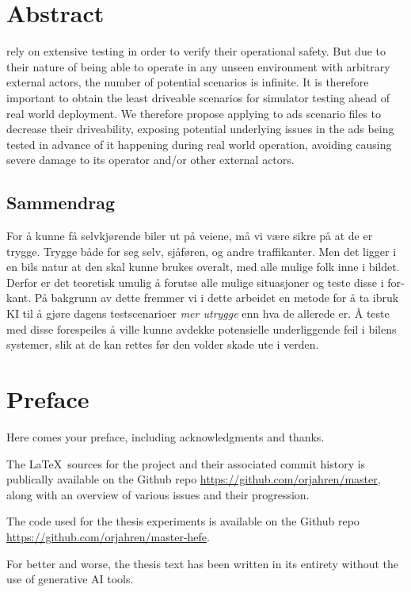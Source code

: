 \chapter*{Abstract}

 rely on extensive testing in order to verify their operational safety. But due to
their nature of being able to operate in any unseen environment with arbitrary external actors,
the number of potential scenarios is infinite. It is therefore important to obtain the least
driveable scenarios for simulator testing ahead of real world deployment. We therefore propose
applying  to \acrlong{ads} scenario files to decrease their driveability, exposing
potential underlying issues in the \acrshort{ads} being tested in advance of it happening during
real world operation, avoiding causing severe damage to its operator and/or other external actors.


\begin{otherlanguage}{norsk}
    \section*{Sammendrag}
    For å kunne få selvkjørende biler ut på veiene, må vi være sikre på at de er trygge. Trygge både
    for seg selv, sjåføren, og andre traffikanter. Men det ligger i en bils natur at den skal kunne
    brukes overalt, med alle mulige folk inne i bildet. Derfor er det teoretisk umulig å forutse
    alle mulige situasjoner og teste disse i forkant. På bakgrunn av dette fremmer vi i dette
    arbeidet en metode for å ta ibruk KI til å gjøre dagens testscenarioer \textit{mer utrygge} enn
    hva de allerede er. Å teste med disse forespeiles å ville kunne avdekke potensielle
    underliggende feil i bilens systemer, slik at de kan rettes før den volder skade ute i verden.
\end{otherlanguage}

\chapter*{Preface}
Here comes your preface, including acknowledgments and thanks.

The \LaTeX~sources for the project and their associated commit history is publically available on
the Github repo \url{https://github.com/orjahren/master}, along with an overview of various issues
and their progression.

The code used for the thesis experiments is available on the Github repo \url{https://github.com/orjahren/master-hefe}.

For better and worse, the thesis text has been written in its entirety without the use of generative
AI tools.